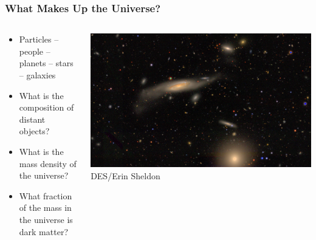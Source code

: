 \documentclass{beamer}
\begin{document}
\frame
{

    \frametitle{What Makes Up the Universe?}


    \begin{columns}
        \begin{column}{0.5\textwidth}
            \begin{itemize}


                \item Particles -- people -- planets -- stars -- galaxies

                \item What is the composition of distant objects?

                \item What is the mass density of the universe?

                \item What fraction of the mass in the universe
                    is dark matter?

            \end{itemize}
        \end{column}
        \begin{column}{0.5\textwidth}
            \begin{center}
                \includegraphics[width=1.2\textwidth, angle=90]{DES0056-5248_gri_crop.jpg}
                \newline
                {\tiny DES/Erin Sheldon}
            \end{center}
        \end{column}
    \end{columns}


}
\end{document}
